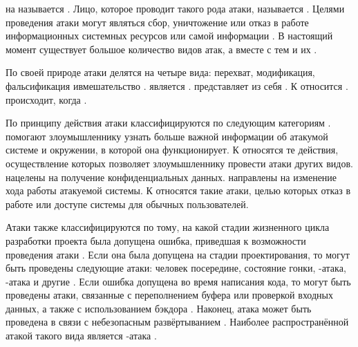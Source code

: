 %
 на  называется  .
%
Лицо, которое проводит такого рода атаки, называется  . 
%
Целями проведения атаки могут являться сбор, уничтожение или отказ в работе информационных системных ресурсов или самой информации . 
%
В настоящий момент существует большое количество видов атак, а вместе с тем и их .

%
По своей природе атаки делятся на четыре вида: перехват, модификация, фальсификация ивмешательство . 
%
 является .
%
 представляет из себя .
%
К  относится .
%
 происходит, когда .

%
По принципу действия атаки классифицируются по следующим категориям .
%
 помогают злоумышленнику узнать больше важной информации об атакумой системе и окружении, в которой она функционирует.
%
К  относятся те действия, осуществление которых позволяет злоумышленнику провести атаки других видов. 
%
 нацелены на получение конфиденциальных данных. 
%
 направлены на изменение хода работы атакуемой системы. 
%
К  относятся такие атаки, целью которых отказ в работе или доступе системы для обычных пользователей. 

%
Атаки также классифицируются по тому, на какой стадии жизненного цикла разработки проекта была допущена ошибка, приведшая к возможности проведения атаки .
%
Если она была допущена на стадии проектирования, то могут быть проведены следующие атаки: человек посередине, состояние гонки, -атака, -атака и другие .
%
Если ошибка допущена во время написания кода, то могут быть проведены атаки, связанные с переполнением буфера или проверкой входных данных, а также с использованием бэкдора .
%
Наконец, атака может быть проведена в связи с небезопасным развёртыванием . 
%
Наиболее распространённой атакой такого вида является -атака 
. 

